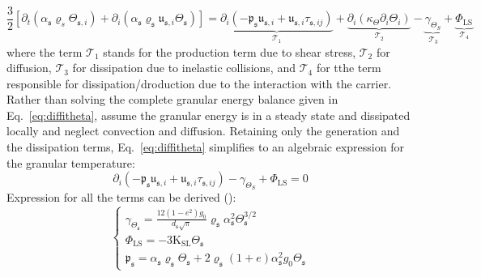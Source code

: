 \documentclass[11pt]{report}
\begin{document}
\begin{equation}\label{eq:diffitheta}
\frac{3}{2}\left[\partial_t\left(\alpha_{\mathfrak{s}} \varrho_{s} \Theta_{\mathfrak{s},i}\right)+\partial_i\left(\alpha_{\mathfrak{s}}\varrho_{\mathfrak{s}}\mathfrak{u}_{\mathfrak{s},i} \Theta_{\mathfrak{s}}\right)\right]= \underbrace{\partial_i\left(-\mathfrak{p}_{\mathfrak{s}}\mathfrak{u}_{\mathfrak{s},i}+\mathfrak{u}_{\mathfrak{s},i}\tau_{\mathfrak{s},ij}\right)}_{\mathcal{T}_1}+\underbrace{\partial_i\left(\kappa_{\Theta}\partial_i\Theta_i\right)}_{\mathcal{T}_2}-\underbrace{\gamma_{\Theta_S}}_{\mathcal{T}_3}+\underbrace{\Phi_{\mathrm{LS}}}_{\mathcal{T}_4}
\end{equation}
where the term $\mathcal{T}_1$ stands for the production term due to shear stress, $\mathcal{T}_2$ for diffusion, $\mathcal{T}_3$ for dissipation due to inelastic collisions, and $\mathcal{T}_4$ for tthe term responsible for dissipation/droduction  due to the interaction with the carrier.
%
Rather than solving the complete granular energy balance given in Eq.~\ref{eq:diffitheta}, \cite{Ekambara-2009} assume the granular energy is in a steady state and dissipated locally and neglect convection and diffusion. 
%
Retaining only the generation and the dissipation terms, Eq.~\ref{eq:diffitheta} simplifies to an algebraic expression for the granular temperature:
%
\begin{equation}
\partial_i\left(-\mathfrak{p}_{\mathfrak{s}}\mathfrak{u}_{\mathfrak{s},i}+\mathfrak{u}_{\mathfrak{s},i}\tau_{\mathfrak{s},ij}\right)-\gamma_{\Theta_S}+\Phi_{\mathrm{LS}}=0
\end{equation}
%
Expression for all the terms can be derived (\cite{GID-1994}):
%
\begin{equation}
\begin{cases}
\gamma_{\Theta_{\mathfrak{s}}}=\frac{12\left(1-e^{2}\right) g_{0}}{d_{\mathfrak{s}} \sqrt{\pi}} \varrho_{\mathfrak{s}} \alpha_{\mathfrak{s}}^{2} \Theta_{\mathfrak{s}}^{3/2}\\
\Phi_{\mathrm{LS}}=-3 \mathrm{K}_{\mathrm{SL}} \Theta_{\mathfrak{s}}\\
\mathfrak{p}_{\mathfrak{s}}=\alpha_{\mathfrak{s}} \varrho_{\mathfrak{s}} \Theta_{\mathfrak{s}}+2 \varrho_{\mathfrak{s}}\left(1+e\right) \alpha_{\mathfrak{s}}^{2} g_{0} \Theta_{\mathfrak{s}}
\end{cases}
\end{equation}
\end{document}
